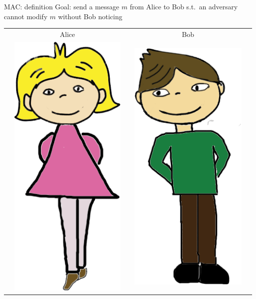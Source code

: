 \documentclass[usenames,dvipsnames, 9pt]{beamer}
\begin{document}
\begin{frame}{MAC: definition}
\Large
Goal: send a message $m$ from Alice to Bob s.t.\ an adversary cannot modify $m$ without Bob noticing \\[10pt]
	\begin{center}
		\begin{tabular}{c c c c c}
			& Alice  & & Bob &  \\
			& \multirow{5}{*}{\includegraphics[scale=0.20]{Alice}} & &
			\multirow{5}{*}{\includegraphics[scale=0.20]{Bob}} &  \\

\end{tabular}
\end{center}
\end{frame}
\end{document}
